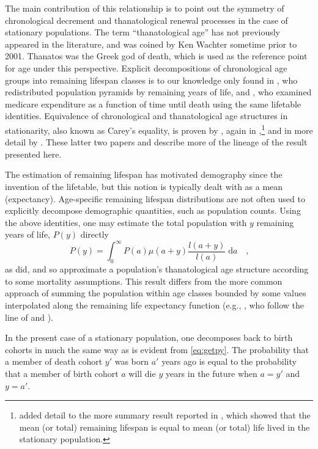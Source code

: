 \documentclass[leqno]{article}
\newcommand{\dd}{\; \mathrm{d}}
\begin{document}
The main contribution of this relationship is to point out
the symmetry of chronological decrement and thanatological renewal processes in
the case of stationary populations. The term ``thanatological age'' has not
previously appeared in the literature, and was coined by Ken Wachter sometime prior to 2001. Thanatos was
the Greek god of death, which is used as the reference point for age under this
perspective. Explicit decompositions of chronological
age groups into remaining lifespan classes is to our knowledge only found in
\citet{brouard1986structure}, who redistributed
population pyramids by remaining years of life, and
\citet{miller2001increasing}, who examined medicare expenditure as a function of time until death using the
same lifetable identities. Equivalence of chronological and
thanatological age structures in stationarity, also known as Carey's equality,
is proven by \citet{brouard1989mouvements}, again in
 \citet{vaupel2009life},\footnote{\citet{vaupel2009life} added detail to the
 more summary result reported in \citet{goldstein2009life}, which showed that
 the mean (or total) remaining lifespan is equal to mean (or total) life lived in the stationary population.} and in more detail by \citet{rao2014generalization}.
These latter two papers and \citet{goldstein2012historical} describe more of the
lineage of the result presented here. 

The estimation of remaining lifespan has motivated demography since
the invention of the lifetable, but this notion is typically dealt with as a
mean (expectancy). Age-specific remaining lifespan distributions are not often
used to explicitly decompose demographic quantities, such as population counts. Using
the above identities, one may estimate the total population with $y$
remaining years of life, $P(y)$ directly
\begin{equation}
\label{eq:getpy}
P(y) = \int _0 ^\infty P(a)\mu(a+y)\frac{l(a+y)}{l(a)} \dd a \quad \text{,}
\end{equation}
\noindent as \citet{brouard1986structure} did, and so approximate a population's
thanatological age structure according to some mortality assumptions. This result differs from the more common approach
of summing the population within age classes bounded by some values interpolated
along the remaining life expectancy function (e.g.,
\citet{sanderson2005average,sanderson2007new,sanderson2010remeasuring}, who
follow the line of \citet{hersch1944demographie} and \citet{ryder1975notes}).

In the present case of a stationary population, one decomposes back to birth
cohorts in much the same way as is evident from \eqref{eq:getpy}. The
probability that a member of death cohort $y'$ was born $a'$ years ago is equal to the probability that a member of birth cohort $a$ will die $y$ years in the future when $a = y'$ and $y = a'$.
\end{document}
